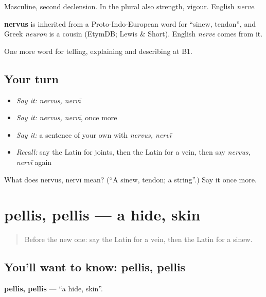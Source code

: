 Masculine, second declension. In the plural also strength, vigour. English \emph{nerve}.

\begin{cousinweb}
\textbf{nervus} is inherited from a Proto-Indo-European word for \textquotedblleft{}sinew, tendon\textquotedblright{}, and Greek \emph{neuron} is a cousin (EtymDB; Lewis \& Short). English \emph{nerve} comes from it.
\end{cousinweb}

\begin{grammarlens}[title={What you've built}]
One more word for telling, explaining and describing at B1.
\end{grammarlens}

\subsection*{Your turn}
\begin{itemize}
\raggedright
  \item \emph{Say it:} \emph{nervus, nervī}
  \item \emph{Say it:} \emph{nervus, nervī}, once more
  \item \emph{Say it:} a sentence of your own with \emph{nervus, nervī}
  \item \emph{Recall:} say the Latin for joints, then the Latin for a vein, then say \emph{nervus, nervī} again
\end{itemize}

\begin{tcolorbox}[breakable,colback=teal!4,colframe=teal!35!black,title={Before you move on}]
What does nervus, nervī mean? (\textquotedblleft{}A sinew, tendon; a string\textquotedblright{}.) Say it once more.
\end{tcolorbox}
\section[pellis, pellis]{pellis, pellis — a hide, skin}

\label{lesson:LA-C517-pellis}



\begin{quote}
Before the new one: say the Latin for a vein, then the Latin for a sinew.
\end{quote}

\subsection*{You'll want to know: pellis, pellis}
\textbf{pellis, pellis} — \textquotedblleft{}a hide, skin\textquotedblright{}.

